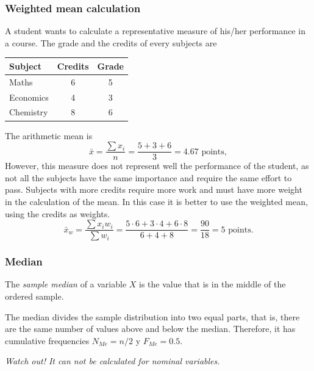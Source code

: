 \begin{frame}
\frametitle{Weighted mean calculation}
A student wants to calculate a representative measure of his/her performance in a course. 
The grade and the credits of every subjects are 
\begin{center}
\footnotesize
\begin{tabular}{lcc}
\hline
Subject & Credits & Grade\\
\hline
Maths & 6 & 5 \\
Economics & 4 & 3 \\
Chemistry & 8 & 6 \\
\hline
\end{tabular}
\end{center}
The arithmetic mean is 
\[
\bar{x} = \frac{\sum x_i}{n} = \frac{5+3+6}{3}= 4.67 \text{ points},
\]
However, this measure does not represent well the performance of the student, as not all the subjects have the same
importance and require the same effort to pass. 
Subjects with more credits require more work and must have more weight in the calculation of the mean. 
In this case it is better to use the weighted mean, using the credits as weights.
\[
\bar{x}_w = \frac{\sum x_iw_i}{\sum w_i} = \frac{5\cdot 6+3\cdot 4+6\cdot 8}{6+4+8}= \frac{90}{18} = 5 \text{ points}.
\]
\end{frame}


\begin{frame}
\frametitle{Median}
\begin{definition}
The \emph{sample median} of a variable $X$ is the value that is in the middle of the ordered sample. 
\end{definition}

The median divides the sample distribution into two equal parts, that is, there are the same number of values above and
below the median. Therefore, it has cumulative frequencies $N_{Me}= n/2$ y  $F_{Me}= 0.5$.

\begin{center}
\alert{\emph{Watch out! It can not be calculated for nominal variables.}}
\end{center}

\end{frame}


